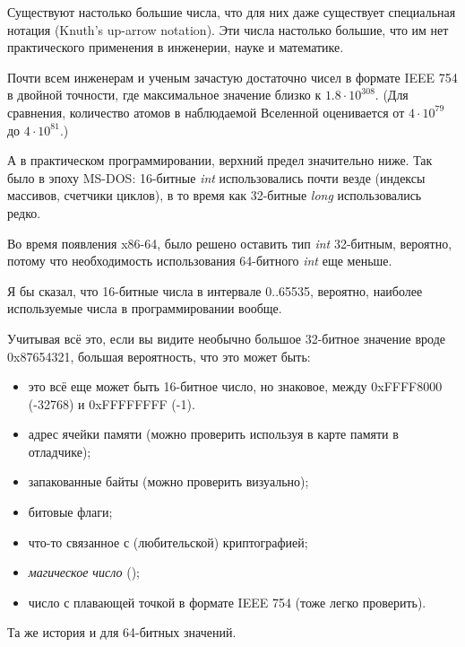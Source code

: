 Существуют настолько большие числа,
что для них даже существует специальная нотация (Knuth's up-arrow notation).
Эти числа настолько большие, что им нет практического применения в инженерии, науке и математике.

Почти всем инженерам и ученым зачастую достаточно чисел в формате IEEE 754 в двойной точности,
где максимальное значение близко к $1.8 \cdot 10^{308}$.
(Для сравнения, количество атомов в наблюдаемой Вселенной оценивается от $4 \cdot 10^{79}$ до $4 \cdot 10^{81}$.)

А в практическом программировании, верхний предел значительно ниже.
Так было в эпоху MS-DOS: 16-битные \emph{int} использовались почти везде (индексы массивов, счетчики циклов),
в то время как 32-битные \emph{long} использовались редко.

Во время появления x86-64, было решено оставить тип \emph{int} 32-битным, вероятно, потому что 
необходимость использования 64-битного \emph{int} еще меньше.

Я бы сказал, что 16-битные числа в интервале 0..65535, вероятно, наиболее используемые числа в программировании вообще.

Учитывая всё это, если вы видите необычно большое 32-битное значение вроде 0x87654321, большая вероятность,
что это может быть:

\begin{itemize}

\item это всё еще может быть 16-битное число, но знаковое, между 0xFFFF8000 (-32768) и 0xFFFFFFFF (-1).
\item адрес ячейки памяти (можно проверить используя в карте памяти в отладчике);
\item запакованные байты (можно проверить визуально);
\item битовые флаги;
\item что-то связанное с (любительской) криптографией;
\item \emph{магическое число} ();
\item число с плавающей точкой в формате IEEE 754 (тоже легко проверить).

\end{itemize}

Та же история и для 64-битных значений.


